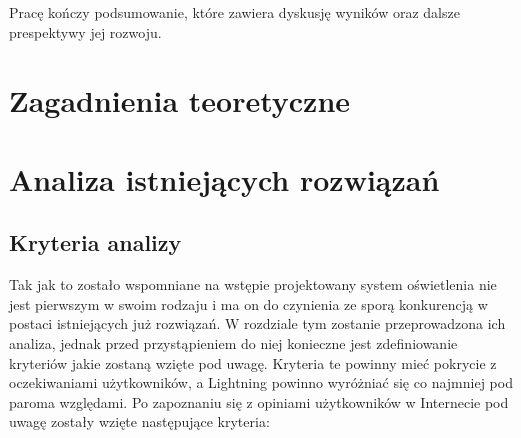 \documentclass[12pt]{report}
\begin{document}
Pracę kończy podsumowanie, które zawiera dyskusję wyników oraz dalsze prespektywy jej rozwoju.

\chapter[Zagadnienia teoretyczne]{Zagadnienia teoretyczne}



\chapter[Analiza istniejących rozwiązań]{Analiza istniejących rozwiązań}

\section{Kryteria analizy} \label{kryt}

Tak jak to zostało wspomniane na wstępie projektowany system oświetlenia nie jest pierwszym w swoim rodzaju i ma on do czynienia ze sporą konkurencją w postaci istniejących już rozwiązań. W rozdziale tym zostanie przeprowadzona ich analiza, jednak przed przystąpieniem do niej konieczne jest zdefiniowanie kryteriów jakie zostaną wzięte pod uwagę. Kryteria te powinny mieć pokrycie z oczekiwaniami użytkowników, a Lightning powinno wyróżniać się co najmniej pod paroma względami. Po zapoznaniu się z opiniami użytkowników w Internecie pod uwagę zostały wzięte następujące kryteria:
\end{document}
